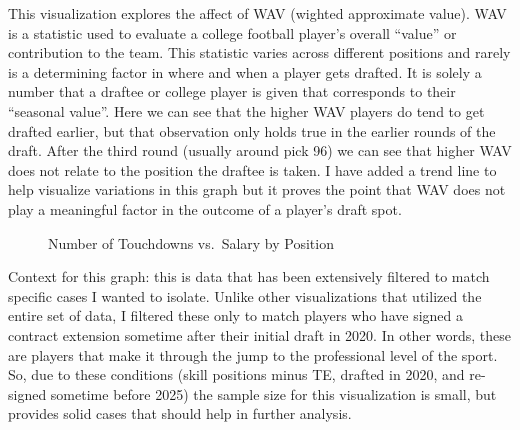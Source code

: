 \documentclass[
  letterpaper,
  DIV=11,
  numbers=noendperiod]{scrartcl}
\begin{document}
This visualization explores the affect of WAV (wighted approximate
value). WAV is a statistic used to evaluate a college football player's
overall ``value'' or contribution to the team. This statistic varies
across different positions and rarely is a determining factor in where
and when a player gets drafted. It is solely a number that a draftee or
college player is given that corresponds to their ``seasonal value''.
Here we can see that the higher WAV players do tend to get drafted
earlier, but that observation only holds true in the earlier rounds of
the draft. After the third round (usually around pick 96) we can see
that higher WAV does not relate to the position the draftee is taken. I
have added a trend line to help visualize variations in this graph but
it proves the point that WAV does not play a meaningful factor in the
outcome of a player's draft spot.

\begin{figure}[H]


\caption{\label{fig-scores_vs_salary}Number of Touchdowns vs.~Salary by
Position}

\end{figure}%

Context for this graph: this is data that has been extensively filtered
to match specific cases I wanted to isolate. Unlike other visualizations
that utilized the entire set of data, I filtered these only to match
players who have signed a contract extension sometime after their
initial draft in 2020. In other words, these are players that make it
through the jump to the professional level of the sport. So, due to
these conditions (skill positions minus TE, drafted in 2020, and
re-signed sometime before 2025) the sample size for this visualization
is small, but provides solid cases that should help in further analysis.
\end{document}
